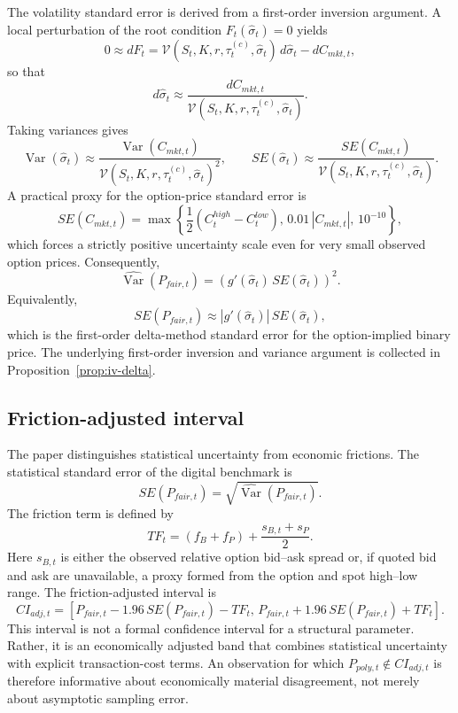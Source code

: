 \documentclass[11pt]{article}
\numberwithin{equation}{section}
\theoremstyle{plain}
\begin{document}
The volatility standard error is derived from a first-order inversion argument. A local perturbation of the root condition $F_t(\hat{\sigma}_t)=0$ yields
\[
0
\approx
dF_t
=
\mathcal{V}(S_t,K,r,\tau_t^{(c)},\hat{\sigma}_t)\,d\hat{\sigma}_t
-dC_{mkt,t},
\]
so that
\[
d\hat{\sigma}_t
\approx
\frac{dC_{mkt,t}}
{\mathcal{V}(S_t,K,r,\tau_t^{(c)},\hat{\sigma}_t)}.
\]
Taking variances gives
\[
\operatorname{Var}(\hat{\sigma}_t)
\approx
\frac{\operatorname{Var}(C_{mkt,t})}
{\mathcal{V}(S_t,K,r,\tau_t^{(c)},\hat{\sigma}_t)^2},
\qquad
SE(\hat{\sigma}_t)
\approx
\frac{SE(C_{mkt,t})}
{\mathcal{V}(S_t,K,r,\tau_t^{(c)},\hat{\sigma}_t)}.
\]
A practical proxy for the option-price standard error is
\[
SE(C_{mkt,t})
=
\max\!\left\{\frac{1}{2}(C^{high}_t-C^{low}_t),\,0.01\,|C_{mkt,t}|,\,10^{-10}\right\},
\]
which forces a strictly positive uncertainty scale even for very small observed option prices. Consequently,
\[
\widehat{\operatorname{Var}}(P_{fair,t})
=
\left(g'(\hat{\sigma}_t)\,SE(\hat{\sigma}_t)\right)^2.
\]
Equivalently,
\[
SE(P_{fair,t})
\approx
\left|g'(\hat{\sigma}_t)\right|\,SE(\hat{\sigma}_t),
\]
which is the first-order delta-method standard error for the option-implied binary price. The underlying first-order inversion and variance argument is collected in Proposition~\ref{prop:iv-delta}.

\subsection{Friction-adjusted interval}
The paper distinguishes statistical uncertainty from economic frictions. The statistical standard error of the digital benchmark is
\[
SE(P_{fair,t})=\sqrt{\widehat{\operatorname{Var}}(P_{fair,t})}.
\]
The friction term is defined by
\[
TF_t=(f_B+f_P)+\frac{s_{B,t}+s_P}{2}.
\]
Here $s_{B,t}$ is either the observed relative option bid--ask spread or, if quoted bid and ask are unavailable, a proxy formed from the option and spot high--low range. The friction-adjusted interval is
\[
CI_{adj,t}
=
\left[
P_{fair,t}-1.96\,SE(P_{fair,t})-TF_t,\,
P_{fair,t}+1.96\,SE(P_{fair,t})+TF_t
\right].
\]
This interval is not a formal confidence interval for a structural parameter. Rather, it is an economically adjusted band that combines statistical uncertainty with explicit transaction-cost terms. An observation for which $P_{poly,t}\notin CI_{adj,t}$ is therefore informative about economically material disagreement, not merely about asymptotic sampling error.
\end{document}
